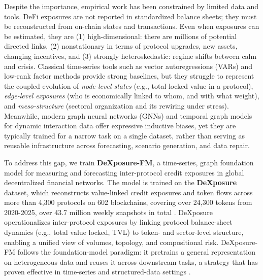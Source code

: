 Despite the importance, empirical work has been constrained by limited data and tools. %
DeFi exposures are not reported in standardized balance sheets; they must be reconstructed from on-chain states and transactions. Even when exposures can be estimated, they are (1) high-dimensional: there are millions of potential directed links, (2) nonstationary in terms of protocol upgrades, new assets, changing incentives, and (3) strongly heteroskedastic: regime shifts between calm and crisis. Classical time-series tools such as vector autoregressions (VARs) \citep{Sims1980} and low-rank factor methods \citep{StockWatson2002} provide strong baselines, but they struggle to represent the coupled evolution of \emph{node-level states} (e.g., total locked value in a protocol), \emph{edge-level exposures} (who is economically linked to whom, and with what weight), and \emph{meso-structure} (sectoral organization and its rewiring under stress). Meanwhile, modern graph neural networks (GNNs) \citep{KipfWelling2017,VelickovicEtAl2018} and temporal graph models for dynamic interaction data \citep{RossiEtAl2020TGN} offer expressive inductive biases, yet they are typically trained for a narrow task on a single dataset, rather than serving as reusable infrastructure across forecasting, scenario generation, and data repair.

To address this gap, we train \textbf{DeXposure-FM}, a time-series, graph foundation model for measuring and forecasting inter-protocol credit exposures in global decentralized financial networks. The model is trained on the \textbf{DeXposure} dataset, which reconstructs value-linked credit exposures and token flows across more than 4,300 protocols on 602 blockchains, covering over 24,300 tokens from 2020-2025, over 43.7 million weekly snapshots in total \cite{wu2025}. DeXposure operationalizes inter-protocol exposures by linking protocol balance-sheet dynamics (e.g., total value locked, TVL) to token- and sector-level structure, enabling a unified view of volumes, topology, and compositional risk. DeXposure-FM follows the foundation-model paradigm: it pretrains a general representation on heterogeneous data and reuses it across downstream tasks, a strategy that has proven effective in time-series and structured-data settings \cite{liang2024fmts,eremeev2025g2tfm}. 

